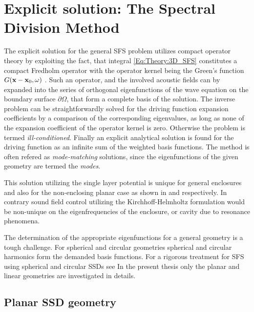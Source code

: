 
\section{Explicit solution: The Spectral Division Method}

The explicit solution for the general SFS problem utilizes compact operator theory by exploiting the fact, that integral \ref{Eq:Theory:3D_SFS} constitutes a compact Fredholm operator with the operator kernel being the Green's function $G(\mathbf{x} - \mathbf{x}_0 , \omega )$ \cite{Ahrens2012,MorseFeshbach1953}.
Such an operator, and the involved acoustic fields can by expanded into the series of orthogonal eigenfunctions of the wave equation on the boundary surface $\partial \Omega$, that form a complete basis of the solution. The inverse problem can be straightforwardly solved for the driving function expansion coefficients by a comparison of the corresponding eigenvalues, as long as none of the expansion coefficient of the operator kernel is zero. Otherwise the problem is termed \emph{ill-conditioned}. 
Finally an explicit analytical solution is found for the driving function as an infinite sum of the weighted basis functions.
The method is often refered as \emph{mode-matching} solutions, since the eigenfunctions of the given geometry are termed the \emph{modes}.

This solution utilizing the single layer potential is unique for general enclosures and also for the non-enclosing planar case as shown in \cite{Zotter2013:uniqueness} and \cite{Fazi2010} respectively. In contrary sound field control utilizing the Kirchhoff-Helmholtz formulation would be non-unique on the eigenfrequencies of the enclosure, or cavity due to resonance phenomena.

The determination of the appropriate eigenfunctions for a general geometry is a tough challenge.
For spherical and circular geometries spherical and circular harmonics form the demanded basis functions. For a rigorous treatment for SFS using spherical and circular SSDs see \cite{Ahrens2010phd,Zotter2009phd,Ahrens2012,Ahrens2009:circularSSD_mismatch,Ahrens2009:circular25D_SFR,Ahrens2008:Analytical_Circ_Spherical_SFS}
In the present thesis only the planar and linear geometries are investigated in details.

\subsection{Planar SSD geometry}

